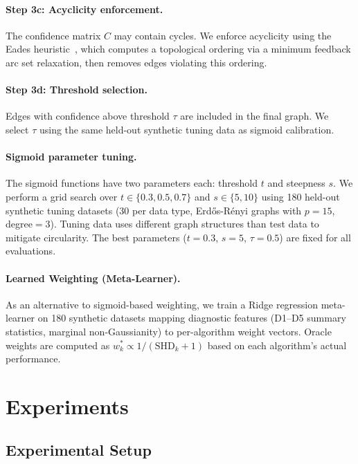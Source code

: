 \documentclass{article}
\begin{document}
\paragraph{Step 3c: Acyclicity enforcement.} The confidence matrix $C$ may contain cycles. We enforce acyclicity using the Eades heuristic~\citep{eades1993fast}, which computes a topological ordering via a minimum feedback arc set relaxation, then removes edges violating this ordering.

\paragraph{Step 3d: Threshold selection.} Edges with confidence above threshold $\tau$ are included in the final graph. We select $\tau$ using the same held-out synthetic tuning data as sigmoid calibration.

\paragraph{Sigmoid parameter tuning.} The sigmoid functions have two parameters each: threshold $t$ and steepness $s$. We perform a grid search over $t \in \{0.3, 0.5, 0.7\}$ and $s \in \{5, 10\}$ using 180 held-out synthetic tuning datasets (30 per data type, Erd\H{o}s-R\'enyi graphs with $p=15$, degree$=3$). Tuning data uses different graph structures than test data to mitigate circularity. The best parameters ($t=0.3$, $s=5$, $\tau=0.5$) are fixed for all evaluations.

\paragraph{Learned Weighting (Meta-Learner).} As an alternative to sigmoid-based weighting, we train a Ridge regression meta-learner on 180 synthetic datasets mapping diagnostic features (D1--D5 summary statistics, marginal non-Gaussianity) to per-algorithm weight vectors. Oracle weights are computed as $w_k^* \propto 1/(\text{SHD}_k + 1)$ based on each algorithm's actual performance.

\section{Experiments}
\label{sec:experiments}

\subsection{Experimental Setup}
\label{sec:setup}
\end{document}
